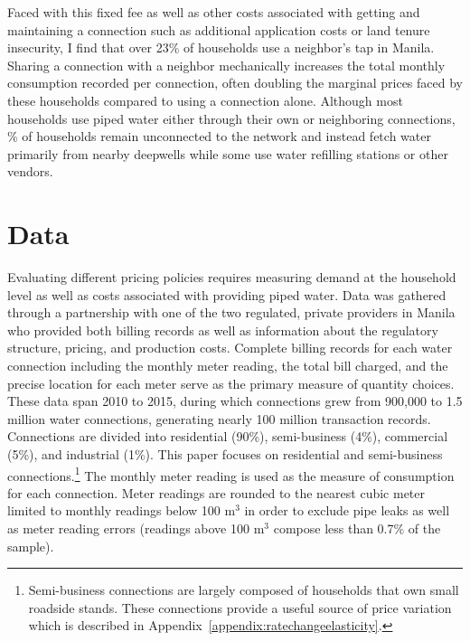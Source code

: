 \documentclass[12pt]{article}
\begin{document}
Faced with this fixed fee as well as other costs associated with getting and maintaining a connection such as additional application costs or land tenure insecurity, I find that over 23\unskip\% of households use a neighbor's tap in Manila.  Sharing a connection with a neighbor mechanically increases the total monthly consumption recorded per connection, often doubling the marginal prices faced by these households compared to using a connection alone.  Although most households use piped water either through their own or neighboring connections, \unskip\% of households remain unconnected to the network and instead fetch water primarily from nearby deepwells while some use water refilling stations or other vendors.



\section{Data}\label{section:data}

Evaluating different pricing policies requires measuring demand at the household level as well as costs associated with providing piped water.  Data was gathered through a partnership with one of the two regulated, private providers in Manila who provided both billing records as well as information about the regulatory structure, pricing, and production costs.  Complete billing records for each water connection including the monthly meter reading, the total bill charged, and the precise location for each meter serve as the primary measure of quantity choices.  These data span 2010 to 2015, during which connections grew from 900,000 to 1.5 million water connections, generating nearly 100 million transaction records.  Connections are divided into residential (90\%), semi-business (4\%), commercial (5\%), and industrial (1\%).  This paper focuses on residential and semi-business connections.\footnote{Semi-business connections are largely composed of households that own small roadside stands.  These connections provide a useful source of price variation which is described in Appendix~\ref{appendix:ratechangeelasticity}.}  The monthly meter reading is used as the measure of consumption for each connection.  Meter readings are rounded to the nearest cubic meter limited to monthly readings below 100 $\text{m}^{3}$ in order to exclude pipe leaks as well as meter reading errors (readings above 100 $\text{m}^{3}$ compose less than 0.7\% of the sample).
\end{document}
